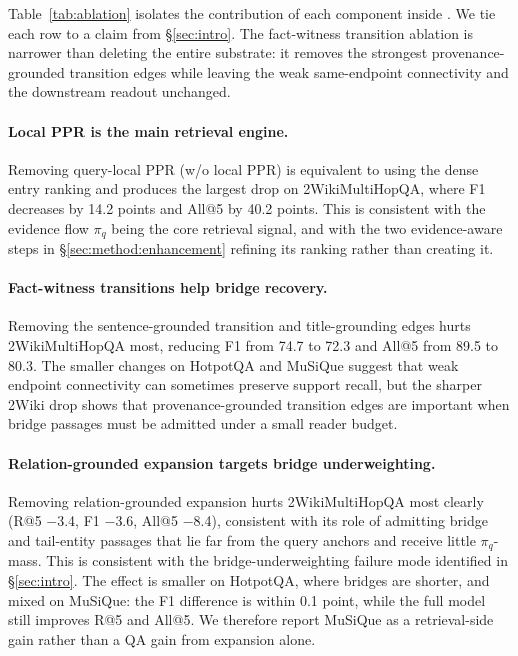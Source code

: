 Table~\ref{tab:ablation} isolates the contribution of each component
inside \methodname{}. We tie each row to a claim from
\S\ref{sec:intro}. The fact-witness transition ablation is narrower
than deleting the entire substrate: it removes the strongest
provenance-grounded transition edges while leaving the weak
same-endpoint connectivity and the downstream readout unchanged.

\paragraph{Local PPR is the main retrieval engine.}
Removing query-local PPR (w/o local PPR) is equivalent to using the
dense entry ranking and produces the largest drop on 2WikiMultiHopQA,
where F1 decreases by 14.2 points and All@5 by 40.2 points. This is
consistent with the evidence flow $\pi_q$ being the core retrieval
signal, and with the two evidence-aware steps in
\S\ref{sec:method:enhancement} refining its ranking rather than creating it.

\paragraph{Fact-witness transitions help bridge recovery.}
Removing the sentence-grounded transition and title-grounding edges
hurts 2WikiMultiHopQA most, reducing F1 from 74.7 to 72.3 and All@5
from 89.5 to 80.3. The smaller changes on HotpotQA and MuSiQue suggest
that weak endpoint connectivity can sometimes preserve support recall,
but the sharper 2Wiki drop shows that provenance-grounded transition
edges are important when bridge passages must be admitted under a small
reader budget.

\paragraph{Relation-grounded expansion targets bridge underweighting.}
Removing relation-grounded expansion hurts 2WikiMultiHopQA most clearly
(R@5 $-$3.4, F1 $-$3.6, All@5 $-$8.4), consistent with its role of
admitting bridge and tail-entity passages that lie far from the query
anchors and receive little $\pi_q$-mass. This is consistent with the
bridge-underweighting failure mode identified in \S\ref{sec:intro}. The effect is smaller on
HotpotQA, where bridges are shorter, and mixed on MuSiQue: the F1
difference is within 0.1 point, while the full model still improves
R@5 and All@5. We therefore report MuSiQue as a retrieval-side gain
rather than a QA gain from expansion alone.

